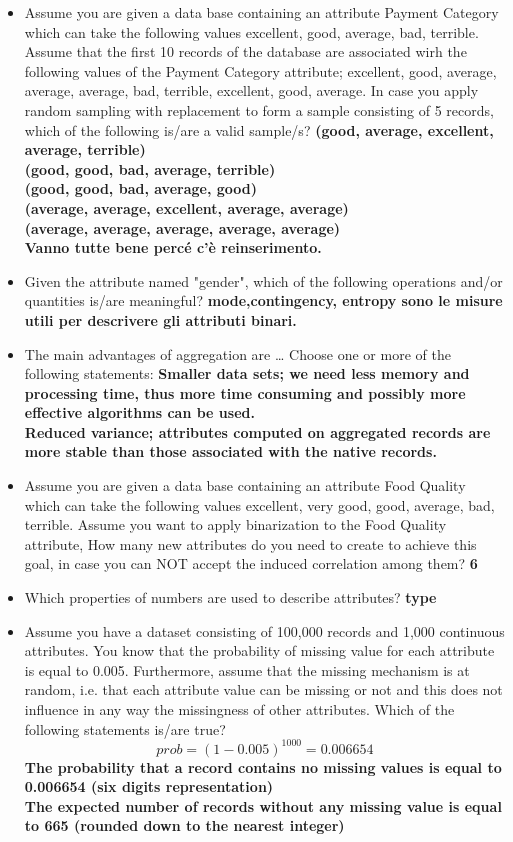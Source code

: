 \documentclass[12pt, a4paper,titlepage,openany]{article}
\begin{document}
\begin{itemize}
	\item Assume you are given a data base containing an attribute Payment Category which can take the following values {excellent, good, average, bad, terrible}. Assume that the first 10 records of the database are associated wirh the following values of the Payment Category attribute; {excellent, good, average, average, average, bad, terrible, excellent, good, average}. In case you apply random sampling with replacement to form a sample consisting of 5 records, which of the following is/are a valid sample/s? \textbf{(good, average, excellent, average, terrible)\\
		(good, good, bad, average, terrible)\\
		(good, good, bad, average, good)\\
		(average, average, excellent, average, average)\\
		(average, average, average, average, average)\\
	Vanno tutte bene percé c'è reinserimento.}
	\item Given the attribute named "gender", which of the following operations and/or quantities is/are meaningful? \textbf{ mode,contingency, entropy sono le misure utili per descrivere gli attributi binari.}
	\item The main advantages of aggregation are … Choose one or more of the following statements: \textbf{Smaller data sets; we need less memory and processing time, thus more time consuming and possibly more effective algorithms can be used. \\ Reduced variance; attributes computed on aggregated records are more stable than those associated with the native records.}
	\item Assume you are given a data base containing an attribute Food Quality which can take the following values {excellent, very good, good, average, bad, terrible}. Assume you want to apply binarization to the Food Quality attribute, How many new attributes do you need to create to achieve this goal, in case you can NOT accept the induced correlation among them? \textbf{6}
	\item Which properties of numbers are used to describe attributes? \textbf{type}
	\item Assume you have a dataset consisting of 100,000 records and 1,000 continuous attributes. You know that the probability of missing value for each attribute is equal to 0.005. Furthermore, assume that the missing mechanism is at random, i.e. that each attribute value can be missing or not and this does not influence in any way the missingness of other attributes. Which of the following statements is/are true? \textbf{\[prob = (1-0.005)^{1000} = 0.006654 \]The probability that a record contains no missing values is equal to 0.006654 (six digits representation) \\ The expected number of records without any missing value is equal to 665 (rounded down to the nearest integer)}

\end{itemize}
\end{document}
